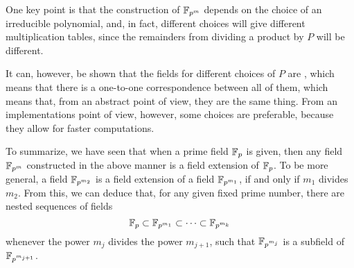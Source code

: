 One key point is that the construction of $\mathbb{F}_{p^m}$ depends on the choice of an irreducible polynomial, and, in fact, different choices will give different multiplication tables, since the remainders from dividing a product by $P$ will be different.

It can, however, be shown that the fields for different choices of $P$ are , which means that there is a one-to-one correspondence between all of them, which means that, from an abstract point of view, they are the same thing. From an implementations point of view, however, some choices are preferable, because they allow for faster computations.

To summarize, we have seen that when a prime field $\mathbb{F}_p$ is given, then any field 
$\mathbb{F}_{p^m}$ constructed in the above manner is a field extension of $\mathbb{F}_p$. To be more general, a field $\mathbb{F}_{p^{m_2}}$ is a field extension of a field $\mathbb{F}_{p^{m_1}}$, if and only if $m_1$ divides $m_2$. From this, we can deduce that, for any given fixed prime number, there are nested sequences of fields
\begin{equation}
\mathbb{F}_p \subset \mathbb{F}_{p^{m_1}} \subset \cdots \subset \mathbb{F}_{p^{m_k}}
\end{equation}
whenever the power $m_j$ divides the power $m_{j+1}$, such that $\mathbb{F}_{p^{m_j}}$ is a subfield of $\mathbb{F}_{p^{m_{j+1}}}$.

